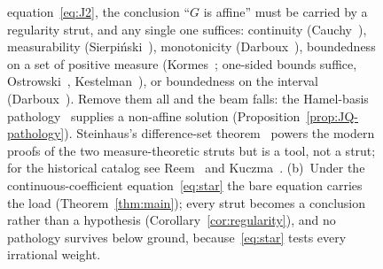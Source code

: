 \documentclass{article}
\theoremstyle{plain}
\theoremstyle{definition}
\begin{document}
\begin{figure}[ht]
{equation~\eqref{eq:J2}, the conclusion ``$G$ is affine'' must be
carried by a regularity strut, and any single one suffices: continuity
(Cauchy~\cite{Cauchy1821}), measurability
(Sierpi\'nski~\cite{Sierpinski1920}), monotonicity
(Darboux~\cite{Darboux1875}), boundedness on a set of positive measure
(Kormes~\cite{Kormes1926}; one-sided bounds suffice,
Ostrowski~\cite{Ostrowski1929}, Kestelman~\cite{Kestelman1947}), or
boundedness on the interval (Darboux~\cite{Darboux1880}). Remove them
all and the beam falls: the Hamel-basis pathology~\cite{Hamel1905}
supplies a non-affine solution (Proposition~\ref{prop:JQ-pathology}).
Steinhaus's difference-set theorem~\cite{Steinhaus1920} powers the
modern proofs of the two measure-theoretic struts but is a tool, not a
strut; for the historical catalog see Reem~\cite{Reem2017} and
Kuczma~\cite[\S13.2]{Kuczma2009}. (b)~Under the continuous-coefficient
equation~\eqref{eq:star} the bare equation carries the load
(Theorem~\ref{thm:main}); every strut becomes a conclusion rather than
a hypothesis (Corollary~\ref{cor:regularity}), and no pathology
survives below ground, because~\eqref{eq:star} tests every irrational
weight.}
\label{fig:dictionary}
\end{figure}
\end{document}
